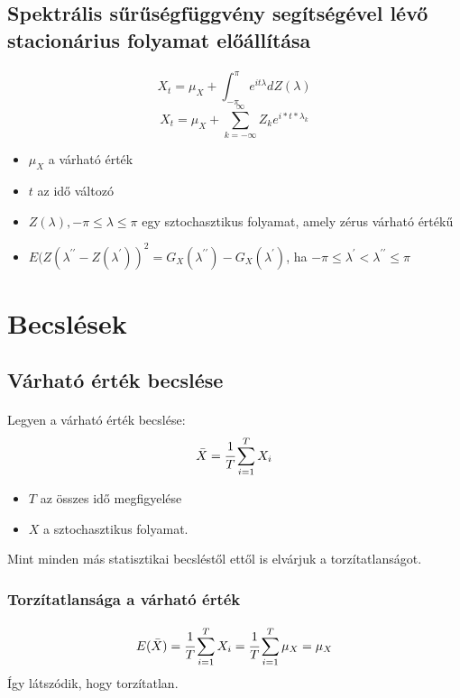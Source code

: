 \documentclass[11pt,a4paper]{article}
\begin{document}
			\subsection{Spektrális sűrűségfüggvény segítségével lévő stacionárius folyamat előállítása}
				\paragraph{}
					$$X_t = \mu_X + \int_{- \pi} ^\pi e^{it\lambda} d Z(\lambda)$$
					$$X_t = \mu_X + \sum_{k=-\infty}^{\infty}Z_ke^{i*t*\lambda_k}$$
					\begin{itemize}
						\item $\mu_X$ a várható érték
						\item $t$ az idő változó
						\item $Z(\lambda), -\pi \le \lambda \le \pi$ egy sztochasztikus folyamat, amely zérus várható értékű
						\item $E(Z(\lambda^{\prime\prime} - Z(\lambda^{\prime}))^2 = G_X(\lambda^{\prime \prime}) -G_X(\lambda^{\prime})$, ha $-\pi \le \lambda^{\prime} < \lambda^{\prime \prime} \le \pi$ 
					\end{itemize}
		\section{Becslések}
			\subsection{Várható érték becslése}
				\paragraph{}
					Legyen a várható érték becslése:
					$$\bar{X} = \cfrac{1}{T} \sum_{i = 1}^{T}X_i$$
					\begin{itemize}
						\item $T$ az összes idő megfigyelése
						\item $X$ a sztochasztikus folyamat.
					\end{itemize}
					Mint minden más statisztikai becsléstől ettől is elvárjuk a torzítatlanságot.
				\subsubsection{Torzítatlansága a várható érték}
					\paragraph{}
						$$E(\bar{X}) = \cfrac{1}{T} \sum_{i = 1}^{T}X_i = \cfrac{1}{T} \sum_{i=1}^T \mu_X = \mu_X$$
						Így látszódik, hogy torzítatlan.
\end{document}
